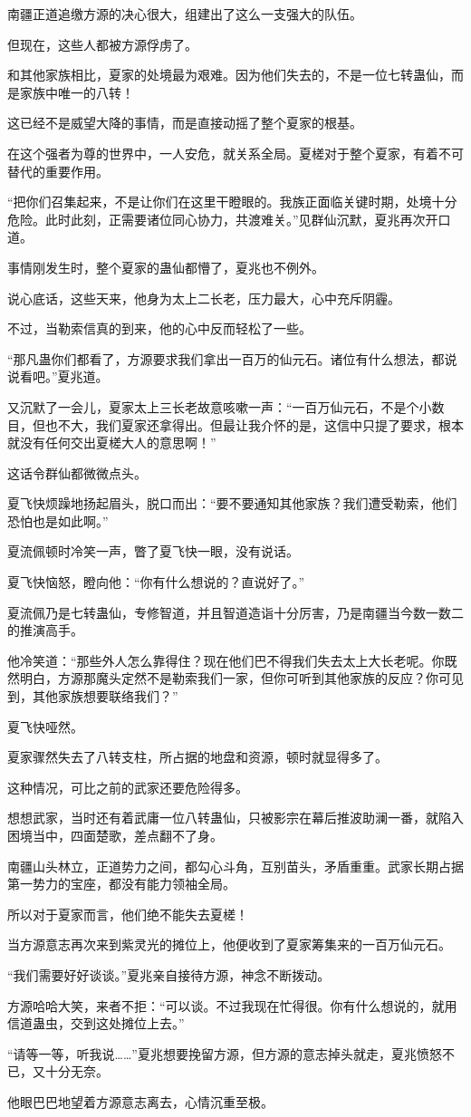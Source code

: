 \begin{this_body}
南疆正道追缴方源的决心很大，组建出了这么一支强大的队伍。

但现在，这些人都被方源俘虏了。

和其他家族相比，夏家的处境最为艰难。因为他们失去的，不是一位七转蛊仙，而是家族中唯一的八转！

这已经不是威望大降的事情，而是直接动摇了整个夏家的根基。

在这个强者为尊的世界中，一人安危，就关系全局。夏槎对于整个夏家，有着不可替代的重要作用。

“把你们召集起来，不是让你们在这里干瞪眼的。我族正面临关键时期，处境十分危险。此时此刻，正需要诸位同心协力，共渡难关。”见群仙沉默，夏兆再次开口道。

事情刚发生时，整个夏家的蛊仙都懵了，夏兆也不例外。

说心底话，这些天来，他身为太上二长老，压力最大，心中充斥阴霾。

不过，当勒索信真的到来，他的心中反而轻松了一些。

“那凡蛊你们都看了，方源要求我们拿出一百万的仙元石。诸位有什么想法，都说说看吧。”夏兆道。

又沉默了一会儿，夏家太上三长老故意咳嗽一声：“一百万仙元石，不是个小数目，但也不大，我们夏家还拿得出。但最让我介怀的是，这信中只提了要求，根本就没有任何交出夏槎大人的意思啊！”

这话令群仙都微微点头。

夏飞快烦躁地扬起眉头，脱口而出：“要不要通知其他家族？我们遭受勒索，他们恐怕也是如此啊。”

夏流佩顿时冷笑一声，瞥了夏飞快一眼，没有说话。

夏飞快恼怒，瞪向他：“你有什么想说的？直说好了。”

夏流佩乃是七转蛊仙，专修智道，并且智道造诣十分厉害，乃是南疆当今数一数二的推演高手。

他冷笑道：“那些外人怎么靠得住？现在他们巴不得我们失去太上大长老呢。你既然明白，方源那魔头定然不是勒索我们一家，但你可听到其他家族的反应？你可见到，其他家族想要联络我们？”

夏飞快哑然。

夏家骤然失去了八转支柱，所占据的地盘和资源，顿时就显得多了。

这种情况，可比之前的武家还要危险得多。

想想武家，当时还有着武庸一位八转蛊仙，只被影宗在幕后推波助澜一番，就陷入困境当中，四面楚歌，差点翻不了身。

南疆山头林立，正道势力之间，都勾心斗角，互别苗头，矛盾重重。武家长期占据第一势力的宝座，都没有能力领袖全局。

所以对于夏家而言，他们绝不能失去夏槎！

当方源意志再次来到紫灵光的摊位上，他便收到了夏家筹集来的一百万仙元石。

“我们需要好好谈谈。”夏兆亲自接待方源，神念不断拨动。

方源哈哈大笑，来者不拒：“可以谈。不过我现在忙得很。你有什么想说的，就用信道蛊虫，交到这处摊位上去。”

“请等一等，听我说……”夏兆想要挽留方源，但方源的意志掉头就走，夏兆愤怒不已，又十分无奈。

他眼巴巴地望着方源意志离去，心情沉重至极。

\end{this_body}

